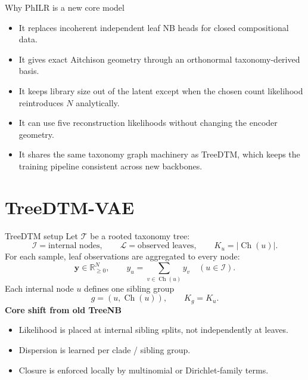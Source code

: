\documentclass[aspectratio=169,10pt]{beamer}
\newcommand{\R}{\mathbb R}
\newcommand{\T}{\mathcal T}
\newcommand{\I}{\mathcal I}
\newcommand{\Lleaf}{\mathcal L}
\newcommand{\Ch}{\operatorname{Ch}}
\begin{document}
\begin{frame}{Why PhILR is a new core model}
\small
\begin{itemize}
  \item It replaces incoherent independent leaf NB heads for closed compositional data.
  \item It gives exact Aitchison geometry through an orthonormal taxonomy-derived basis.
  \item It keeps library size out of the latent except when the chosen count likelihood reintroduces \(N\) analytically.
  \item It can use five reconstruction likelihoods without changing the encoder geometry.
  \item It shares the same taxonomy graph machinery as TreeDTM, which keeps the training pipeline consistent across new backbones.
\end{itemize}
\end{frame}

\section{TreeDTM-VAE}

\begin{frame}{TreeDTM setup}
\small
Let \(\T\) be a rooted taxonomy tree:
\[
\I=\text{internal nodes},\qquad
\Lleaf=\text{observed leaves},\qquad
K_u=|\Ch(u)|.
\]
For each sample, leaf observations are aggregated to every node:
\[
\bm y\in\R_{\ge 0}^{N},\qquad
y_u=\sum_{v\in\Ch(u)}y_v\quad (u\in\I).
\]
Each internal node \(u\) defines one sibling group
\[
g=(u,\Ch(u)),\qquad K_g=K_u.
\]
\textbf{Core shift from old TreeNB}
\begin{itemize}
  \item Likelihood is placed at internal sibling splits, not independently at leaves.
  \item Dispersion is learned per clade / sibling group.
  \item Closure is enforced locally by multinomial or Dirichlet-family terms.
\end{itemize}
\end{frame}
\end{document}
